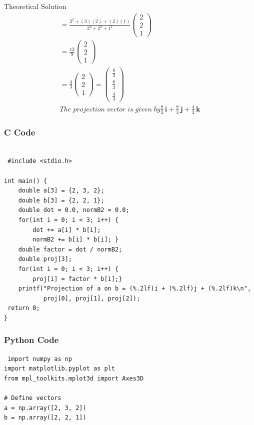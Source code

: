 \documentclass{beamer}
\begin{document}
\begin{frame}{Theoretical Solution}
\begin{align*}
=\frac{2^2+(3)(2)+(2)(1)}{2^2+2^2+1^2}\begin{pmatrix} 2 \\ 2 \\1 \end{pmatrix}\\
=\frac{12}{9}\begin{pmatrix} 2 \\ 2 \\1 \end{pmatrix}\\
=\frac{4}{3}\begin{pmatrix} 2 \\ 2 \\1 \end{pmatrix}
=\begin{pmatrix}
    \frac{8}{3} \\ \frac{8}{3}  \\    \frac{4}{3}
    \end{pmatrix}\\
    The \;projection\; vector \;is \;given\; by \frac{{8}}{3}\,\mathbf{i} + \frac{8}{3}\,\mathbf{j}+ 
\frac{4}{3}\,\mathbf{k}
\end{align*}
\end{frame}


 


 

\begin{frame}[fragile]
    \frametitle{C Code }

    \begin{lstlisting}

 #include <stdio.h>

int main() {
    double a[3] = {2, 3, 2};
    double b[3] = {2, 2, 1};
    double dot = 0.0, normB2 = 0.0;
    for(int i = 0; i < 3; i++) {
        dot += a[i] * b[i];
        normB2 += b[i] * b[i]; }
    double factor = dot / normB2;
    double proj[3];
    for(int i = 0; i < 3; i++) {
        proj[i] = factor * b[i];}
    printf("Projection of a on b = (%.2lf)i + (%.2lf)j + (%.2lf)k\n",
           proj[0], proj[1], proj[2]);
 return 0;
}
 \end{lstlisting}
\end{frame}

\begin{frame}[fragile]
    \frametitle{Python Code}
    \begin{lstlisting}
 import numpy as np
import matplotlib.pyplot as plt
from mpl_toolkits.mplot3d import Axes3D

# Define vectors
a = np.array([2, 3, 2])
b = np.array([2, 2, 1])

    \end{lstlisting}
\end{frame}
\end{document}
